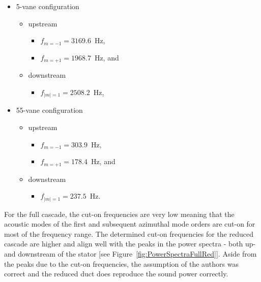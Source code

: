 \begin{minipage}[t]{0.5\textwidth}
\begin{itemize}
	\item 5-vane configuration 
	\begin{itemize}
		\item upstream
		\begin{itemize}
			\item[] $f_{m=-1} = 3169.6$~Hz, 
			\item[] $f_{m=+1} = 1968.7$~Hz, and
		\end{itemize}
		\item downstream 
		\begin{itemize}
			\item[] $f_{|m|=1} = 2508.2$~Hz,
		\end{itemize}
	\end{itemize}
\end{itemize}
\end{minipage}
\begin{minipage}[t]{0.5\textwidth}
\begin{itemize}
	\item 55-vane configuration 
	\begin{itemize}
		\item upstream
		\begin{itemize}
			\item[] $f_{m=-1} = 303.9$~Hz, 
			\item[] $f_{m=+1} = 178.4$~Hz, and
		\end{itemize}
		\item downstream 
		\begin{itemize}
			\item[] $f_{|m|=1} = 237.5$~Hz.
		\end{itemize}
	\end{itemize}
\end{itemize}
\end{minipage}
\vspace{0.5em}  


For the full cascade, the cut-on frequencies are very low meaning that the acoustic modes of the first and subsequent azimuthal mode orders are cut-on for most of the frequency range.  The determined cut-on frequencies for the reduced cascade are higher and align well with the peaks in the power spectra - both up- and downstream of the stator [see Figure~\ref{fig:PowerSpectraFullRed}].  Aside from the peaks due to the cut-on frequencies, the assumption of the authors was correct and the reduced duct does reproduce the sound power correctly.     


